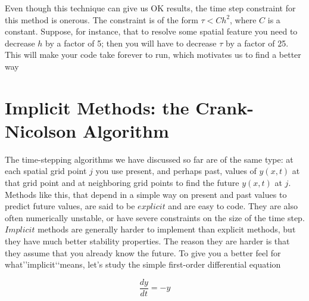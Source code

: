 Even though this technique can give us OK results, the time step constraint for this
method is onerous. The constraint is of the form $\tau < C h^2$, where $C$ is a constant.
Suppose, for instance, that to resolve some spatial feature you need to decrease $h$
by a factor of 5; then you will have to decrease $\tau$ by a factor of 25. This will make
your code take forever to run, which motivates us to find a better way

\section*{Implicit Methods: the Crank-Nicolson Algorithm}

The time-stepping algorithms we have discussed so far are of the same type: at
each spatial grid point $j$ you use present, and perhaps past, values of $y(x,t)$ at that
grid point and at neighboring grid points to find the future $y(x,t)$ at $j$. Methods
like this, that depend in a simple way on present and past values to predict future
values, are said to be $explicit$ and are easy to code. They are also often numerically
unstable, or have severe constraints on the size of the time step.\\
$Implicit$ methods are generally harder to implement than explicit methods,
but they have much better stability properties. The reason they are harder is that
they assume that you already know the future. To give you a better feel for what\rq\rq implicit\lq\lq means, let\rq s study the simple first-order differential equation

\begin{equation}\label{eq:713}
\frac{dy}{dt	} = -y
\end{equation}
